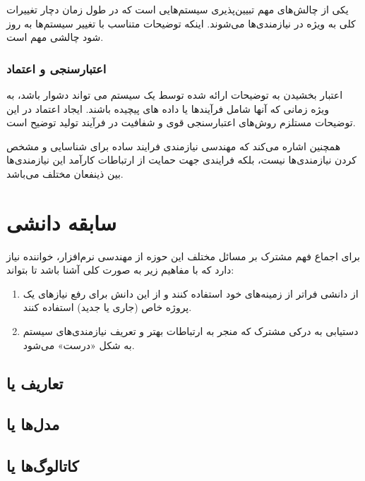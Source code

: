 یکی از چالش‌های مهم تبیین‌پذیری سیستم‌هایی است که در طول زمان دچار تغییرات کلی
به ویژه در نیازمندی‌ها می‌شوند. اینکه توضیحات متناسب با تغییر سیستم‌ها به روز
شود چالشی مهم است.

\subsubsection{اعتبارسنجی و اعتماد}

اعتبار بخشیدن به توضیحات ارائه شده توسط یک سیستم می تواند دشوار باشد، به ویژه
زمانی که آنها شامل فرآیندها یا داده های پیچیده باشند. ایجاد اعتماد در این
توضیحات مستلزم روش‌های اعتبارسنجی قوی و شفافیت در فرآیند تولید توضیح است.

همچنین اشاره می‌کند که مهندسی نیازمندی فرایند ساده برای شناسایی و مشخص کردن
نیازمندی‌ها نیست، بلکه فرایندی جهت حمایت از ارتباطات کارآمد این نیازمندی‌ها بین
ذینفعان مختلف می‌باشد.

\section{سابقه دانشی}

برای اجماع فهم مشترک بر مسائل مختلف این حوزه از مهندسی نرم‌افزار، خواننده نیاز
دارد که با مفاهیم زیر به صورت کلی آشنا باشد تا بتواند:

\begin{enumerate}
    \item از دانشی فراتر از زمینه‌های خود استفاده کنند و از این دانش برای رفع
    نیاز‌های یک پروژه خاص (جاری یا جدید) استفاده کنند.
    \item دستیابی به درکی مشترک که منجر به ارتباطات بهتر و تعریف نیازمندی‌های
    سیستم به شکل «درست» می‌شود.
\end{enumerate}

\subsection{تعاریف یا }

\subsection{مدل‌ها یا }

\subsection{کاتالوگ‌ها یا }
